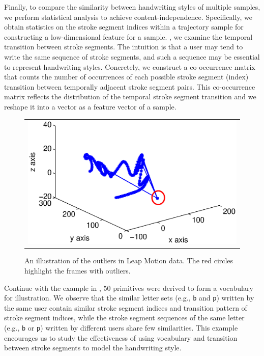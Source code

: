 Finally, to compare the similarity between handwriting styles of multiple samples, we perform statistical analysis to achieve content-independence.  Specifically, we obtain statistics on the stroke segment indices within a trajectory sample for constructing a low-dimensional feature for a sample. , we examine the temporal transition between stroke segments. The intuition is that a user may tend to write the same sequence of stroke segments, and such a sequence may be essential to represent handwriting styles. Concretely, we construct a co-occurrence matrix that counts the number of occurrences of each possible stroke segment (index) transition between temporally adjacent stroke segment pairs. This co-occurrence matrix reflects the distribution of the temporal stroke segment transition and we reshape it into a vector as a feature vector of a sample.




\begin{figure}[!b]
\vspace{-8mm}
\centering
\begin{tabular}{c}
{\includegraphics[width=0.65\columnwidth]{./Graphic/noise/noise_1.eps}} 
\end{tabular}
\vspace{-2mm}
\caption{An illustration of the outliers in Leap Motion data. The red circles highlight the frames with outliers.}
\label{fig:noises}
\end{figure}




Continue with the example in , $50$ primitives were derived to form a vocabulary for illustration. We observe that the similar letter sets (e.g., \texttt{b} and \texttt{p}) written by the same user contain similar stroke segment indices and transition pattern of stroke segment indices, while the stroke segment sequences of the same letter (e.g., \texttt{b} or \texttt{p}) written by different users share few similarities.  
This example encourages us to study the effectiveness of using vocabulary and transition between stroke segments to model the handwriting style. 

